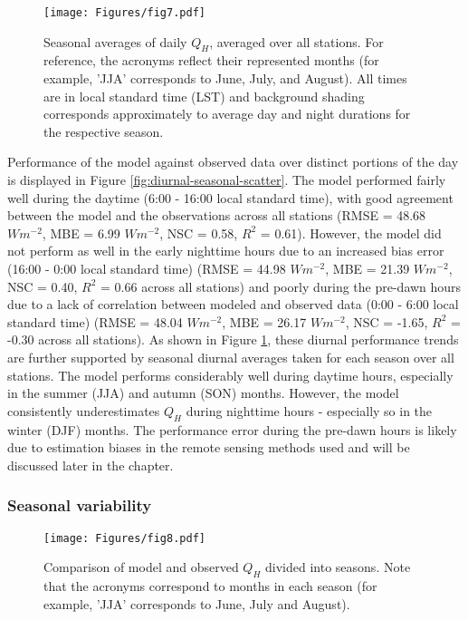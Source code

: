 \begin{figure}[!h]
    \centering
        \texttt{[image: Figures/fig7.pdf]}
    \caption{Seasonal averages of daily $Q_H$, averaged over all stations. For reference, the acronyms reflect their represented months (for example, 'JJA' corresponds to June, July, and August). All times are in local standard time (LST) and background shading corresponds approximately to average day and night durations for the respective season. }
    \label{fig:quee-timeseries}
\end{figure}

Performance of the model against observed data over distinct portions of the day is displayed in Figure \ref{fig:diurnal-seasonal-scatter}. The model performed fairly well during the daytime (6:00 - 16:00 local standard time), with good agreement between the model and the observations across all stations (RMSE = 48.68 $W m^{-2}$, MBE = 6.99 $W m^{-2}$, NSC = 0.58, $R^2$ = 0.61). However, the model did not perform as well in the early nighttime hours due to an increased bias error (16:00 - 0:00 local standard time) (RMSE = 44.98 $W m^{-2}$, MBE = 21.39 $W m^{-2}$, NSC = 0.40, $R^2$ = 0.66 across all stations) and poorly during the pre-dawn hours due to a lack of correlation between modeled and observed data (0:00 - 6:00 local standard time) (RMSE = 48.04 $W m^{-2}$, MBE = 26.17 $W m^{-2}$, NSC = -1.65, $R^2$ = -0.30 across all stations). As shown in Figure \ref{fig:quee-timeseries}, these diurnal performance trends are further supported by seasonal diurnal averages taken for each season over all stations. The model performs considerably well during daytime hours, especially in the summer (JJA) and autumn (SON) months. However, the model consistently underestimates $Q_H$ during nighttime hours - especially so in the winter (DJF) months. The performance error during the pre-dawn hours is likely due to estimation biases in the remote sensing methods used and will be discussed later in the chapter.

\FloatBarrier

\subsubsection{Seasonal variability} \label{section:results-seasonal-variability}

\begin{figure}[!h]
    \centering
        \texttt{[image: Figures/fig8.pdf]}
    \caption{Comparison of model and observed $Q_H$ divided into seasons. Note that the acronyms correspond to months in each season (for example, 'JJA' corresponds to June, July and August).}
    \label{fig:seasonal-scatter}
\end{figure}

